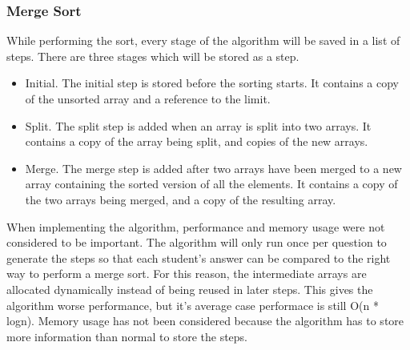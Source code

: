 \subsubsection{Merge Sort}

While performing the sort, every stage of the algorithm will be saved in a list of steps. There are three stages which will be stored as a step.
\begin{itemize}
    \item Initial. The initial step is stored before the sorting starts. It contains a copy of the unsorted array and a reference to the limit.
    \item Split. The split step is added when an array is split into two arrays. It contains a copy of the array being split, and copies of the new arrays.
    \item Merge. The merge step is added after two arrays have been merged to a new array containing the sorted version of all the elements. It contains a copy of the two arrays being merged, and a copy of the resulting array.
\end{itemize}
When implementing the algorithm, performance and memory usage were not considered to be important. The algorithm will only run once per question to generate the steps so that each student's answer can be compared to the right way to perform a merge sort. For this reason, the intermediate arrays are allocated dynamically instead of being reused in later steps. This gives the algorithm worse performance, but it's average case performace is still O(n * logn). Memory usage has not been considered because the algorithm has to store more information than normal to store the steps.